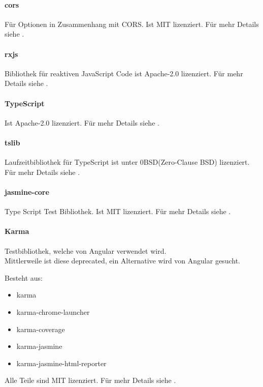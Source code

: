 \paragraph{cors}
Für Optionen in Zusammenhang mit \ac{CORS}.
Ist MIT lizenziert.
Für mehr Details siehe .

\paragraph{rxjs}
Bibliothek für reaktiven JavaScript Code
ist Apache-2.0 lizenziert.
Für mehr Details siehe .

\paragraph{\gls{TypeScript}}
Ist Apache-2.0 lizenziert.
Für mehr Details siehe .

\paragraph{tslib}
Laufzeitbibliothek für \gls{TypeScript}
ist unter 0BSD(Zero-Clause BSD) lizenziert.
Für mehr Details siehe .


\paragraph{jasmine-core}
Type Script Test Bibliothek.
Ist MIT lizenziert.
Für mehr Details siehe .

\paragraph{Karma}
Testbibliothek, welche von Angular verwendet wird.\\
Mittlerweile ist diese deprecated, ein Alternative wird von Angular gesucht.

Besteht aus:
\begin{itemize}
    \item karma
    \item karma-chrome-launcher
    \item karma-coverage
    \item karma-jasmine
    \item karma-jasmine-html-reporter
\end{itemize}

Alle Teile sind MIT lizenziert.
Für mehr Details siehe .


